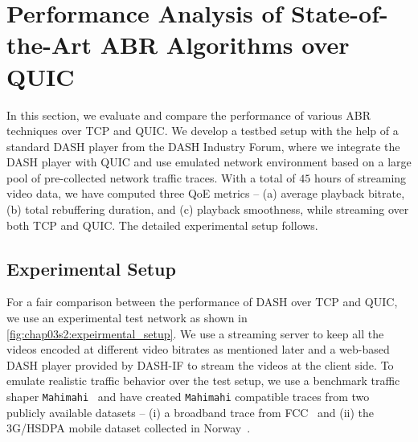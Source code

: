 \section{Performance Analysis of State-of-the-Art ABR Algorithms over QUIC}
\label{chap04:sec:qui-dash}
In this section, we evaluate and compare the performance of various ABR
techniques over \ac{TCP} and \ac{QUIC}. We develop a testbed setup with the help of a standard DASH player from the \ac{DASH} Industry Forum, where we integrate the \ac{DASH} player with \ac{QUIC} and use emulated network environment based on a large pool of pre-collected network traffic traces. With a total of $45$ hours of streaming video data, we have computed three \ac{QoE} metrics -- (a) average playback bitrate, (b) total rebuffering duration, and (c) playback smoothness, while streaming over both \ac{TCP} and \ac{QUIC}. The detailed experimental setup follows. 

\subsection{Experimental Setup}
\label{chap03s2:sec:experimentalSetup}
For a fair comparison between the performance of \ac{DASH} over \ac{TCP} and \ac{QUIC},
we use an experimental test network as shown in \fig\ref{fig:chap03s2:expeirmental_setup}. We use a streaming server to keep all the videos encoded at different video bitrates as mentioned later and a web-based DASH player provided by \ac{DASH-IF} to stream the videos at the client side. To emulate realistic traffic behavior over the test setup, we use a benchmark traffic shaper {\tt Mahimahi}~\cite{mahimahi} and have created {\tt Mahimahi} compatible traces from two publicly available datasets -- (i) a broadband trace from FCC~\cite{dataset-fcc} and (ii) the 3G/HSDPA mobile dataset collected in Norway~\cite{dataset-norway}. 

